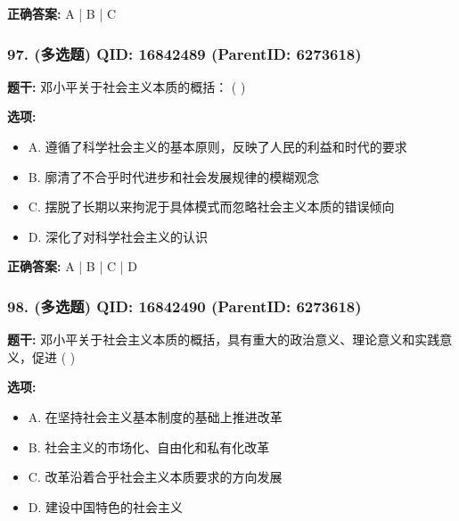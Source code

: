 \documentclass[12pt,UTF8]{ctexart}
\begin{document}
\textbf{正确答案:}
A | B | C

\vspace{0.3em}\hrulefill\vspace{0.7em}

\subsubsection*{97. (多选题) \small QID: 16842489 (ParentID: 6273618)}

\textbf{题干:}
邓小平关于社会主义本质的概括： ( )



\textbf{选项:}
\begin{itemize}[leftmargin=*]

  \item A. 遵循了科学社会主义的基本原则，反映了人民的利益和时代的要求

  \item B. 廓清了不合乎时代进步和社会发展规律的模糊观念

  \item C. 摆脱了长期以来拘泥于具体模式而忽略社会主义本质的错误倾向

  \item D. 深化了对科学社会主义的认识

\end{itemize}

\textbf{正确答案:}
A | B | C | D

\vspace{0.3em}\hrulefill\vspace{0.7em}

\subsubsection*{98. (多选题) \small QID: 16842490 (ParentID: 6273618)}

\textbf{题干:}
邓小平关于社会主义本质的概括，具有重大的政治意义、理论意义和实践意义，促进 ( )



\textbf{选项:}
\begin{itemize}[leftmargin=*]

  \item A. 在坚持社会主义基本制度的基础上推进改革

  \item B. 社会主义的市场化、自由化和私有化改革

  \item C. 改革沿着合乎社会主义本质要求的方向发展

  \item D. 建设中国特色的社会主义

\end{itemize}
\end{document}
